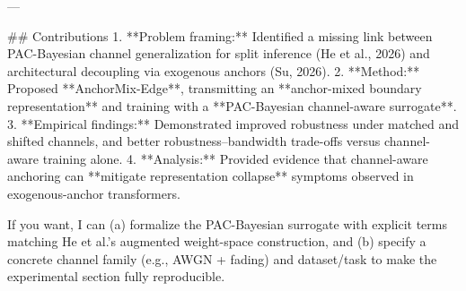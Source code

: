 ---

## Contributions  
1. **Problem framing:** Identified a missing link between PAC-Bayesian channel generalization for split inference (He et al., 2026) and architectural decoupling via exogenous anchors (Su, 2026).  
2. **Method:** Proposed **AnchorMix-Edge**, transmitting an **anchor-mixed boundary representation** and training with a **PAC-Bayesian channel-aware surrogate**.  
3. **Empirical findings:** Demonstrated improved robustness under matched and shifted channels, and better robustness–bandwidth trade-offs versus channel-aware training alone.  
4. **Analysis:** Provided evidence that channel-aware anchoring can **mitigate representation collapse** symptoms observed in exogenous-anchor transformers.

If you want, I can (a) formalize the PAC-Bayesian surrogate with explicit terms matching He et al.’s augmented weight-space construction, and (b) specify a concrete channel family (e.g., AWGN + fading) and dataset/task to make the experimental section fully reproducible.